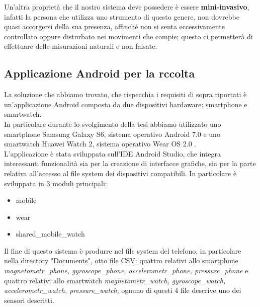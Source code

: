 \documentclass[a4paper]{article}
\begin{document}
\makebox[\linewidth]{}
\makebox[\linewidth]{}
Un'altra proprietà che il nostro sistema deve possedere è essere \textbf{mini-invasivo}, infatti la persona che utilizza uno strumento di questo genere, non dovrebbe quasi accorgersi della sua presenza, affinché non si senta eccessivamente controllato oppure disturbato nei movimenti che compie; questo ci permetterà di effettuare delle misurazioni naturali e non falsate.


	\subsection{Applicazione Android per la rccolta}
La soluzione che abbiamo trovato, che rispecchia i requisiti di sopra riportati è un'applicazione Android composta da due dispositivi hardaware: smartphone e smartwatch. \\ 
In particolare durante lo svolgimento della tesi abbiamo utilizzato uno smartphone Samsung Galaxy S6, sistema operativo Android 7.0 e uno smartwatch Huawei Watch 2, sistema operativo Wear OS 2.0 . \\
L'applicazione è stata sviluppata sull’IDE Android Studio, che integra interessanti funzionalità sia per la creazione di interfacce grafiche, sia per la parte relativa all’accesso al file system dei dispositivi compatibili.
In particolare è sviluppata in 3 moduli principali:
\begin{itemize}
\item mobile
\item wear
\item shared\_mobile\_watch \\
\end{itemize}
Il fine di questo sistema è produrre nel file system del telefono, in particolare nella directory "Documents", otto file CSV: quattro relativi allo smartphone \textit{magnetometr\_phone, gyroscope\_phone, accelerometr\_phone, pressure\_phone} e quattro relativi allo smartwatch \textit{magnetometr\_watch, gyroscope\_watch, accelerometr\_watch, pressure\_watch}; ognuno di questi 4 file descrive uno dei sensori descritti. \\
\end{document}

